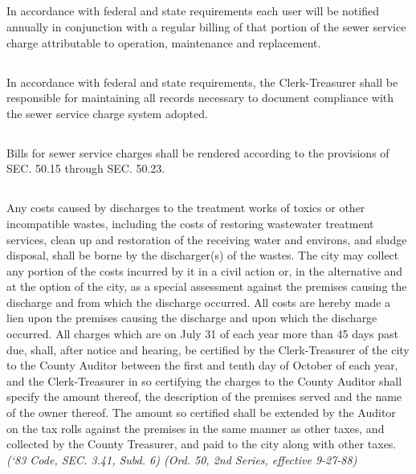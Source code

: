\documentclass[code.tex]{subfiles}
\begin{document}
\subsection{}
In accordance with federal and state requirements each user will be notified annually in conjunction with a regular billing of that portion of the sewer service charge attributable to operation, maintenance and replacement.
\subsection{}
In accordance with federal and state requirements, the Clerk-Treasurer shall be responsible for maintaining all records necessary to document compliance with the sewer service charge system adopted.
\subsection{}
Bills for sewer service charges shall be rendered according to the provisions of SEC. 50.15 through SEC. 50.23.
\subsection{}
Any costs caused by discharges to the treatment works of toxics or other incompatible wastes, including the costs of restoring wastewater treatment services, clean up and restoration of the receiving water and environs, and sludge disposal, shall be borne by the discharger(s) of the wastes.  The city may collect any portion of the costs incurred by it in a civil action or, in the alternative and at the option of the city, as a special assessment against the premises causing the discharge and from which the discharge occurred. All costs are hereby made a lien upon the premises causing the discharge and upon which the discharge occurred. All charges which are on July 31 of each year more than 45 days past due, shall, after notice and hearing, be certified by the Clerk-Treasurer of the city to the County Auditor between the first and tenth day of October of each year, and the Clerk-Treasurer in so certifying the charges to the County Auditor shall specify the amount thereof, the description of the premises served and the name of the owner thereof. The amount so certified shall be extended by the Auditor on the tax rolls against the premises in the same manner as other taxes, and collected by the County Treasurer, and paid to the city along with other taxes.\newline
\emph{(‘83 Code, SEC. 3.41, Subd. 6) (Ord. 50, 2nd Series, effective 9-27-88)}\newline
\end{document}
